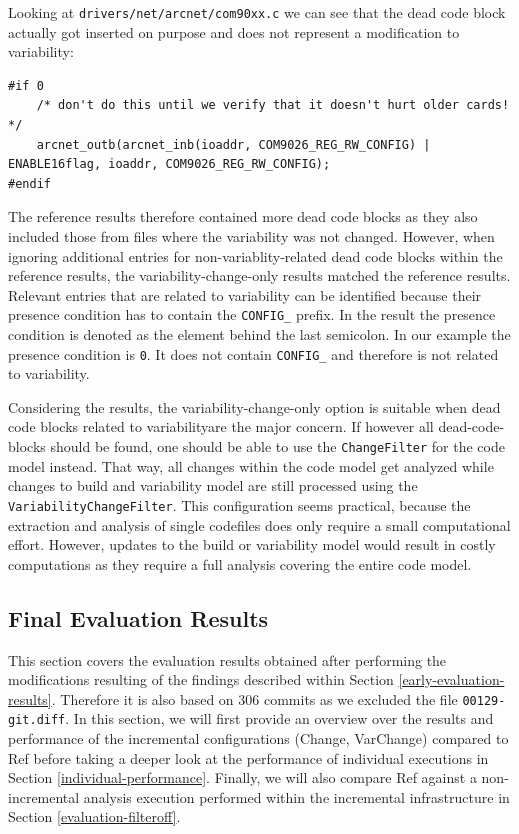 \documentclass[a4paper]{article}
\begin{document}
Looking at \texttt{drivers/net/arcnet/com90xx.c} we can see that the dead code block actually got inserted on purpose and does not represent a modification to variability:

\begin{lstlisting}
#if 0
    /* don't do this until we verify that it doesn't hurt older cards! */
    arcnet_outb(arcnet_inb(ioaddr, COM9026_REG_RW_CONFIG) | ENABLE16flag, ioaddr, COM9026_REG_RW_CONFIG);
#endif
\end{lstlisting}

The reference results therefore contained more dead code blocks as they also included those from files where the variability was not changed. However, when ignoring additional entries for non-variablity-related dead code blocks within the reference results, the variability-change-only results matched the reference results. Relevant entries that are related to variability can be identified because their presence condition has to contain the \texttt{CONFIG\_} prefix. In the result the presence condition is denoted as the element behind the last semicolon. In our example the presence condition is \texttt{0}. It does not contain \texttt{CONFIG\_} and therefore is not related to variability.

Considering the results, the variability-change-only option is suitable when dead code blocks related to variabilityare the major concern. If however all dead-code-blocks should be found, one should be able to use the \texttt{ChangeFilter} for the code model instead. That way, all changes within the code model get analyzed while changes to build and variability model are still processed using the \texttt{VariabilityChangeFilter}. This configuration seems practical, because the extraction and analysis of single codefiles does only require a small computational effort. However, updates to the build or variability model would result in costly computations as they require a full analysis covering the entire code model.

\subsection{Final Evaluation Results} \label{final-evaluation}

This section covers the evaluation results obtained after performing the modifications resulting of the findings described within Section \ref{early-evaluation-results}. Therefore it is also based on 306 commits as we excluded the file \texttt{00129-git.diff}. In this section, we will first provide an overview over the results and performance of the incremental configurations (Change, VarChange) compared to Ref before taking a deeper look at the performance of individual executions in Section \ref{individual-performance}. Finally, we will also compare Ref against a non-incremental analysis execution performed within the incremental infrastructure in Section \ref{evaluation-filteroff}. 
\end{document}
